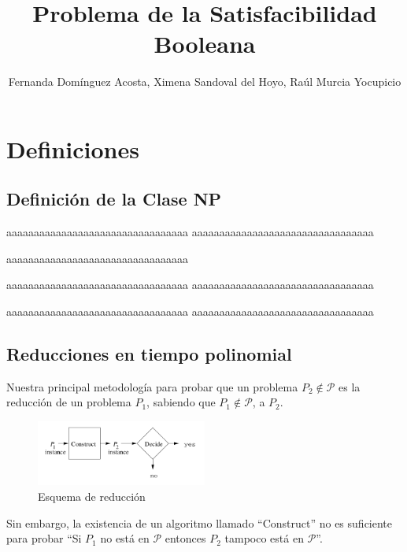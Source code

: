 \documentclass[a4paper]{article}
\title{Problema de la Satisfacibilidad Booleana}
\author{Fernanda Domínguez Acosta, Ximena Sandoval del Hoyo, Raúl Murcia Yocupicio}
\begin{document}
\maketitle


\section{Definiciones}

\subsection{Definición de la Clase NP}

aaaaaaaaaaaaaaaaaaaaaaaaaaaaaaaaa
aaaaaaaaaaaaaaaaaaaaaaaaaaaaaaaaa


aaaaaaaaaaaaaaaaaaaaaaaaaaaaaaaaa

aaaaaaaaaaaaaaaaaaaaaaaaaaaaaaaaa
aaaaaaaaaaaaaaaaaaaaaaaaaaaaaaaaa


aaaaaaaaaaaaaaaaaaaaaaaaaaaaaaaaa
aaaaaaaaaaaaaaaaaaaaaaaaaaaaaaaaa



\subsection{Reducciones en tiempo polinomial}
Nuestra principal metodología para probar que un problema $P_2 \notin \mathcal{P}$
es la reducción de un problema $P_1$, sabiendo que $P_1 \notin \mathcal{P}$, a $P_2$.

\begin{figure}[h]
\centering
\graphicspath{ {./Images/} }
\includegraphics[width=0.5\textwidth]{reduccion.png}
\caption{\label{fig:Reduccion}Esquema de reducción\cite{hopcroft2001introduction}}
\end{figure}
Sin embargo, la existencia de un algoritmo llamado ``Construct'' no es suficiente
para probar ``Si $P_1$ no está en $\mathcal{P}$ entonces $P_2$ tampoco está en $\mathcal{P}$''.
\end{document}
